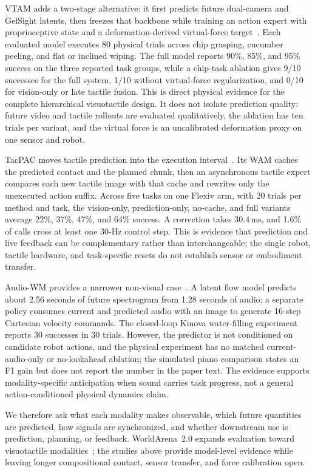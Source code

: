 VTAM adds a two-stage alternative: it first predicts future dual-camera and GelSight latents, then freezes that backbone while training an action expert with proprioceptive state and a deformation-derived virtual-force target~\cite{yuan2026vtam}. Each evaluated model executes 80 physical trials across chip grasping, cucumber peeling, and flat or inclined wiping. The full model reports 90\%, 85\%, and 95\% success on the three reported task groups, while a chip-task ablation gives 9/10 successes for the full system, 1/10 without virtual-force regularization, and 0/10 for vision-only or late tactile fusion. This is direct physical evidence for the complete hierarchical visuotactile design. It does not isolate prediction quality: future video and tactile rollouts are evaluated qualitatively, the ablation has ten trials per variant, and the virtual force is an uncalibrated deformation proxy on one sensor and robot.

TacPAC moves tactile prediction into the execution interval~\cite{ma2026tacpac}. Its WAM caches the predicted contact and the planned chunk, then an asynchronous tactile expert compares each new tactile image with that cache and rewrites only the unexecuted action suffix. Across five tasks on one Flexiv arm, with 20 trials per method and task, the vision-only, prediction-only, no-cache, and full variants average 22\%, 37\%, 47\%, and 64\% success. A correction takes 30.4\,ms, and 1.6\% of calls cross at least one 30-Hz control step. This is evidence that prediction and live feedback can be complementary rather than interchangeable; the single robot, tactile hardware, and task-specific resets do not establish sensor or embodiment transfer.

Audio-WM provides a narrower non-visual case~\cite{zhang2025audiowm}. A latent flow model predicts about 2.56 seconds of future spectrogram from 1.28 seconds of audio; a separate policy consumes current and predicted audio with an image to generate 16-step Cartesian velocity commands. The closed-loop Kinova water-filling experiment reports 30 successes in 30 trials. However, the predictor is not conditioned on candidate robot actions, and the physical experiment has no matched current-audio-only or no-lookahead ablation; the simulated piano comparison states an F1 gain but does not report the number in the paper text. The evidence supports modality-specific anticipation when sound carries task progress, not a general action-conditioned physical dynamics claim.

We therefore ask what each modality makes observable, which future quantities are predicted, how signals are synchronized, and whether downstream use is prediction, planning, or feedback. WorldArena~2.0 expands evaluation toward visuotactile modalities~\cite{shang2026worldarena2}; the studies above provide model-level evidence while leaving longer compositional contact, sensor transfer, and force calibration open.


